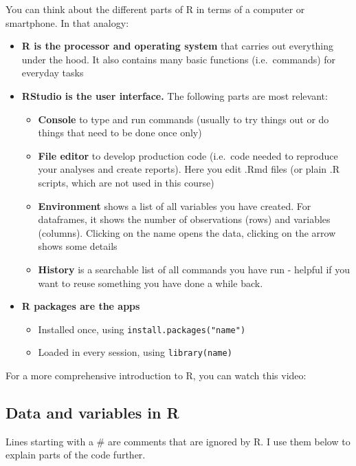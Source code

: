 \documentclass[
]{book}
\providecommand{\tightlist}{%
  \setlength{\itemsep}{0pt}\setlength{\parskip}{0pt}}
\begin{document}
You can think about the different parts of R in terms of a computer or smartphone. In that analogy:

\begin{itemize}
\item
  \textbf{R is the processor and operating system} that carries out everything under the hood. It also contains many basic functions (i.e.~commands) for everyday tasks
\item
  \textbf{RStudio is the user interface.} The following parts are most relevant:

  \begin{itemize}
  \tightlist
  \item
    \textbf{Console} to type and run commands (usually to try things out or do things that need to be done once only)
  \item
    \textbf{File editor} to develop production code (i.e.~code needed to reproduce your analyses and create reports). Here you edit .Rmd files (or plain .R scripts, which are not used in this course)
  \item
    \textbf{Environment} shows a list of all variables you have created. For dataframes, it shows the number of observations (rows) and variables (columns). Clicking on the name opens the data, clicking on the arrow shows some details
  \item
    \textbf{History} is a searchable list of all commands you have run - helpful if you want to reuse something you have done a while back.
  \end{itemize}
\item
  \textbf{R packages are the apps}

  \begin{itemize}
  \tightlist
  \item
    Installed once, using \texttt{install.packages("name")}
  \item
    Loaded in every session, using \texttt{library(name)}
  \end{itemize}
\end{itemize}

For a more comprehensive introduction to R, you can watch this video:

\hypertarget{data-and-variables-in-r}{%
\subsection{Data and variables in R}\label{data-and-variables-in-r}}

Lines starting with a \# are comments that are ignored by R. I use them below to explain parts of the code further.
\end{document}
